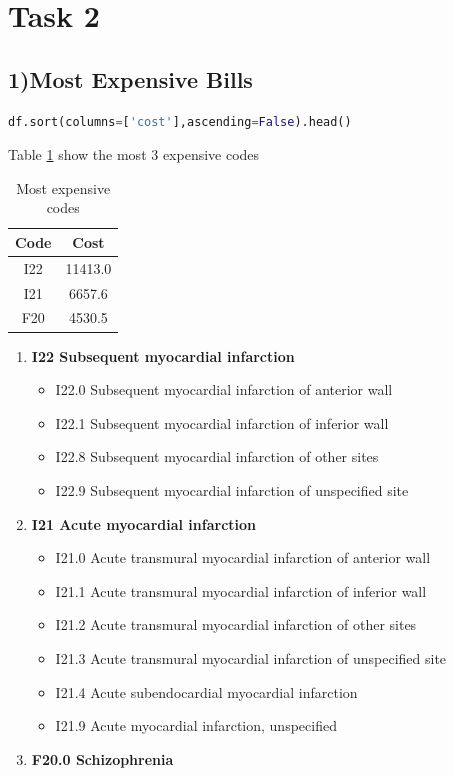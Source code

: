 \documentclass[10pt]{article}
\begin{document}
\section*{Task 2}
\subsection*{1)Most Expensive Bills}
\begin{lstlisting}[language=python]
df.sort(columns=['cost'],ascending=False).head()
\end{lstlisting}
Table \ref{table:3} show the most 3 expensive codes 
\begin{table}[H]
\center
\begin{tabular}{|c|c|}
\hline
\textbf{Code}&\textbf{Cost}\\
\hline
I22 &	11413.0\\
\hline
I21 &	6657.6\\
\hline
F20 &	4530.5\\
\hline
\end{tabular}
\caption{Most expensive codes \label{table:3}}
\begin{enumerate}
\item \textbf{I22 Subsequent myocardial infarction}
\begin{itemize}
\item I22.0 Subsequent myocardial infarction of anterior wall
\item I22.1 Subsequent myocardial infarction of inferior wall
\item I22.8 Subsequent myocardial infarction of other sites
\item I22.9 Subsequent myocardial infarction of unspecified site
\end{itemize}
\item \textbf{I21 Acute myocardial infarction}
\begin{itemize}
\item I21.0 Acute transmural myocardial infarction of anterior wall
\item I21.1 Acute transmural myocardial infarction of inferior wall
\item I21.2 Acute transmural myocardial infarction of other sites
\item I21.3 Acute transmural myocardial infarction of unspecified site
\item I21.4 Acute subendocardial myocardial infarction
\item I21.9 Acute myocardial infarction, unspecified 
\end{itemize}
\item \textbf{F20.0 Schizophrenia}

\end{enumerate}
\end{table}
\end{document}
